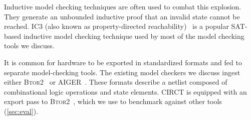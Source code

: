 \documentclass[acmsmall,screen,review]{acmart}
\begin{document}
Inductive model checking techniques are often used to combat this explosion.
They generate an unbounded inductive proof that an invalid state cannot be reached. IC3 (also known as property-directed reachability)~\cite{ic3_original, ic3} is a popular SAT-based inductive model checking
technique used by most of the model checking tools we discuss.

It is common for hardware to be exported in standardized formats and fed to separate model-checking tools.
The existing model checkers we discuss ingest either B\textsc{tor}2~\cite{btor2} or AIGER~\cite{aiger2}.
These formats describe a netlist composed of combinational logic operations and state elements.
CIRCT is equipped with an export pass to B\textsc{tor}2~\cite{amelia_thesis}, which we use to benchmark \toolname{} against other tools (\autoref{sec:eval}).
\end{document}
